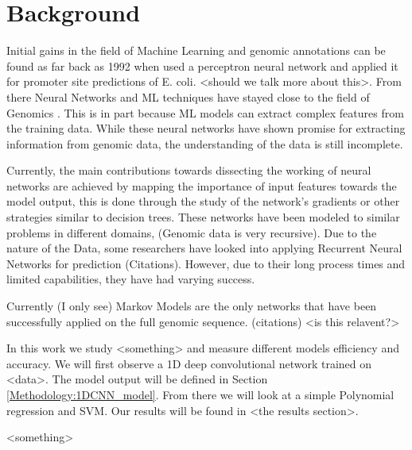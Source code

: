 \section*{Background}


Initial gains in the field of Machine Learning and genomic annotations can be found as far back as 1992 when \cite*{horton1992assessment} used a perceptron neural network and applied it for promoter site predictions of E. coli. <should we talk more about this>. From there Neural Networks and ML techniques have stayed close to the field of Genomics \cite{eraslan2019deep}.  This is in part because ML models can extract complex features from the training data. While these neural networks have shown promise for extracting information from genomic data, the understanding of the data is still incomplete. 

Currently, the main contributions towards dissecting the working of neural networks are achieved by mapping the importance of input features towards the model output, this is done through the study of the network's gradients or other strategies similar to decision trees. These networks have been modeled to similar problems in different domains, (Genomic data is very recursive). Due to the nature of the Data, some researchers have looked into applying Recurrent Neural Networks for prediction (Citations). However, due to their long process times and limited capabilities, they have had varying success.

Currently (I only see) Markov Models are the only networks that have been successfully applied on the full genomic sequence. (citations) <is this relavent?>


In this work we study <something> and measure different models efficiency and accuracy. We will first observe a 1D deep convolutional network trained on <data>. The model output will be defined in Section \ref{Methodology:1DCNN_model}. From there we will look at a simple Polynomial regression and SVM. Our results will be found in <the results section>.


<something>